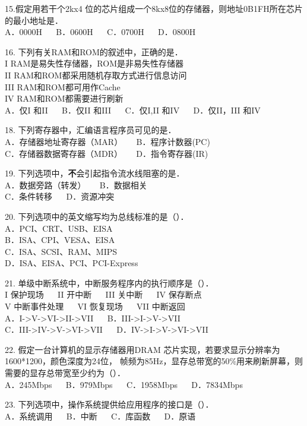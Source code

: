 15.假定用若干个2kx4 位的芯片组成一个8kx8位的存储器，则地址0B1FH所在芯片的最小地址是． \\
A．0000H $\quad$ B．0600H $\quad$ C．0700H $\quad$ D．0800H

16. 下列有关RAM和ROM的叙述中，正确的是． \\
I RAM是易失性存储器，ROM是非易失性存储器 \\
II RAM和ROM都采用随机存取方式进行信息访问 \\
III RAM和ROM都可用作Cache \\
IV RAM和ROM都需要进行刷新 \\
A．仅I 和II $\quad$ B．仅II 和III $\quad$ C．仅I,II 和IV $\quad$ D．仅II，III 和IV

18. 下列寄存器中，汇编语言程序员可见的是． \\
A．存储器地址寄存器（MAR） $\quad$ B．程序计数器(PC) \\
C．存储器数据寄存器（MDR） $\quad$ D．指令寄存器(IR)

19. 下列选项中，\textbf{不}会引起指令流水线阻塞的是． \\
A．数据旁路（转发） $\quad$ B．数据相关 \\
C．条件转移 $\quad$ D．资源冲突

20. 下列选项中的英文缩写均为总线标准的是（）． \\
A．PCI、CRT、USB、EISA \\
B．ISA、CPI、VESA、EISA \\
C．ISA、SCSI、RAM、MIPS \\
D．ISA、EISA、PCI、PCI-Express

21. 单级中断系统中，中断服务程序内的执行顺序是（）． \\
I 保护现场 $\quad$ II 开中断 $\quad$ III 关中断 $\quad$ IV 保存断点 \\
V 中断事件处理 $\quad$ VI 恢复现场 $\quad$ VII 中断返回 \\
A．I->V->VI->II->VII $\quad$ B．III->I->V->VII \\
C．III->IV->V->VI->VII $\quad$ D．IV->I->V->VI->VII

22. 假定一台计算机的显示存储器用DRAM 芯片实现，若要求显示分辨率为1600*1200，颜色深度为24位，
帧频为85Hz，显存总带宽的50\%用来刷新屏幕，则需要的显存总带宽至少约为（）． \\
A．245Mbps $\quad$ B．979Mbps $\quad$ C．1958Mbps $\quad$ D．7834Mbps

23. 下列选项中，操作系统提供给应用程序的接口是（）． \\
A．系统调用 $\quad$ B．中断 $\quad$ C．库函数 $\quad$ D．原语

